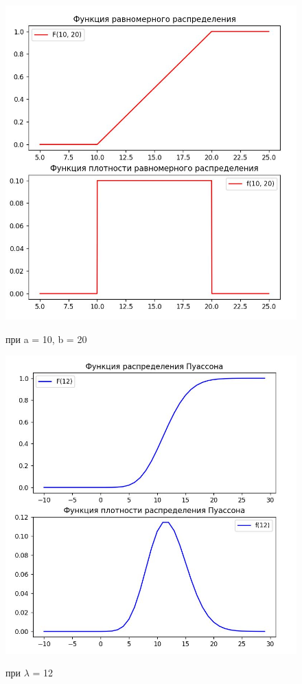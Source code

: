 \documentclass[12pt,a4paper,oneside]{report}
\begin{document}
\begin{figure}[h]
	\centering
	\includegraphics[scale = 1]{1.jpg}
	\label{fig:screenshot001}
	\caption{при a = 10, b = 20}
\end{figure}

\begin{figure}[h]
	\centering
	\includegraphics[scale = 1]{2.jpg}
	\label{fig:screenshot002}
	\caption{при $\lambda$ = 12}
\end{figure}
\end{document}
